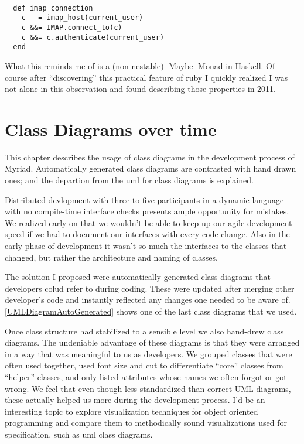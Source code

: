 \begin{lstlisting}

  def imap_connection
    c   = imap_host(current_user)
    c &&= IMAP.connect_to(c)
    c &&= c.authenticate(current_user)
  end

\end{lstlisting}

What this reminds me of is a (non-nestable) |Maybe| Monad in Haskell. Of course after ``discovering'' this practical feature of \gls{ruby} I quickly realized I was not alone in this observation and found \citet{rubymonads} describing those properties in 2011.

\chapter{Class Diagrams over time}
\label{chapter:UMLDiagrams}

This chapter describes the usage of class diagrams in the development process of Myriad. Automatically generated class diagrams are contrasted with hand drawn ones; and the departion from the \gls{uml} for class diagrams is explained.

Distributed devlopment with three to five participants in a dynamic language with no compile-time interface checks presents ample opportunity for mistakes. We realized early on that we wouldn't be able to keep up our agile development speed if we had to document our interfaces with every code change. Also in the early phase of development it wasn't so much the interfaces to the classes that changed, but rather the architecture and naming of classes.

The solution I proposed were automatically generated class diagrams that developers colud refer to during coding. These were updated after merging other developer's code and instantly reflected any changes one needed to be aware of. \autoref{UMLDiagramAutoGenerated} shows one of the last class diagrams that we used.


Once class structure had stabilized to a sensible level we also hand-drew class diagrams. The undeniable advantage of these diagrams is that they were arranged in a way that was meaningful to us as developers. We grouped classes that were often used together, used font size and cut to differentiate ``core'' classes from ``helper'' classes, and only listed attributes whose names we often forgot or got wrong. We feel that even though less standardized than correct UML diagrams, these actually helped us more during the development process. I'd be an interesting topic to explore visualization techniques for object oriented programming and compare them to methodically sound visualizations used for specification, such as \gls{uml} class diagrams.


